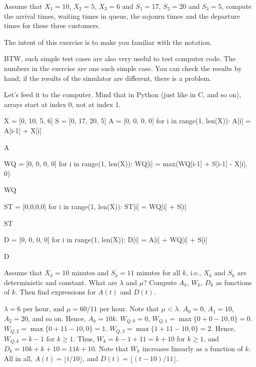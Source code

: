 \begin{extra}
 Assume that $X_1=10$, $X_2=5$, $X_3=6$ and $S_1 = 17$, $S_2=20$ and $S_3=5$, compute the arrival times, waiting times in queue, the sojourn times and the departure times for these three customers.
\begin{hint}
 The intent of this exercise is to make you familiar with the notation.

 BTW, such simple test cases are also very useful to test computer code.
 The numbers in the exercise are one such simple case.
 You can check the results by hand; if the results of the simulator are different, there is a problem.
\end{hint}
\begin{solution} Let's feed it to the computer. Mind that in Python (just like in C, and so on), arrays start at index 0, not at index 1. 
\begin{pyconsole}
X = [0, 10, 5, 6] 
S = [0, 17, 20, 5]
A = [0, 0, 0, 0]
for i in range(1, len(X)):
 A[i] = A[i-1] + X[i]

A

WQ = [0, 0, 0, 0]
for i in range(1, len(X)):
 WQ[i] = max(WQ[i-1] + S[i-1] - X[i], 0)

WQ

ST = [0,0,0,0]
for i in range(1, len(X)):
 ST[i] = WQ[i] + S[i]

ST

D = [0, 0, 0, 0]
for i in range(1, len(X)):
 D[i] = A[i] + WQ[i] + S[i]

D
\end{pyconsole}
 
\end{solution}
\end{extra}



\begin{extra}\label{ex:25}
 Assume that $X_k = 10$ minutes and $S_k = 11$ minutes for all
 $k$, i.e., $X_k$ and $S_k$ are deterministic and constant. What
 are $\lambda$ and $\mu$? Compute $A_k$, $W_k$, $D_k$ as functions of $k$. Then find expressions for $A(t)$ and $D(t)$.
\begin{solution}
 $\lambda=6$ per hour, and $\mu=60/11$ per hour. Note that
 $\mu < \lambda$. $A_0 = 0$, $A_1=10$, $A_2=20$, and so on. Hence,
 $A_k = 10k$. $W_{Q,0} = 0$, $W_{Q,1} = \max\{0 + 0-10,0\} = 0$.
 $W_{Q,2} = \max\{0+11-10,0\} =1$.
 $W_{Q,3} = \max\{1+11-10,0\} =2$. Hence, $W_{Q,k} = k-1$ for
 $k\geq1$. Thus, $W_k = k-1+11 = k + 10$ for $k\geq1$, and
 $D_k = 10k + k+10 = 11k+10$. Note that $W_k$ increases linearly
 as a function of $k$. All in all, $A(t) = \lfloor t/10\rfloor$, and $D(t) = \lfloor (t-10)/11 \rfloor$.
\end{solution}
\end{extra}


